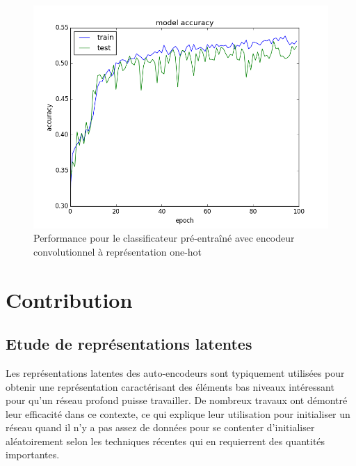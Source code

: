 \documentclass[a4paper, 11pt, onecolumn]{article}
\begin{document}
\begin{figure}[!tbp]
\begin{minipage}[b]{0.3\textwidth}
    \includegraphics[width=\textwidth]{ConvClass}
    \caption{Performance pour le classificateur pré-entraîné avec encodeur
      convolutionnel à représentation one-hot}
  \end{minipage}
\end{figure}


\section{Contribution}

\subsection{Etude de représentations latentes}

Les représentations latentes des auto-encodeurs sont typiquement utilisées pour
obtenir une représentation caractérisant des éléments bas niveaux intéressant
pour qu'un réseau profond puisse travailler. De nombreux travaux ont démontré
leur efficacité dans ce contexte, ce qui explique leur utilisation pour
initialiser un réseau quand il n'y a pas assez de données pour se contenter
d'initialiser aléatoirement selon les techniques récentes qui en requierrent des
quantités importantes.
\end{document}
